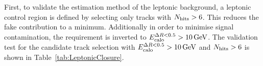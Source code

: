 First, to validate the estimation method of the leptonic background, a leptonic control region is defined by selecting only tracks with $\nhits>6$.
This reduces the fake contribution to a minimum.
Additionally in order to minimise signal contamination, the \ecalo requirement is inverted to $\ecalo>10\gev$.
The validation test for the candidate track selection with $\ecalo>10\gev$ and $\nhits>6$ is shown in Table~\ref{tab:LeptonicClosure}.
\renewcommand{\arraystretch}{1.4}
\begin{table}[!h]
\centering
\caption{Validation test of leptonic background estimation. Left: $\ecalo>10\gev$ and $\nhits>6$ (only statistical uncertainties are included). Right: $\ecalo>10\gev$, $\nhits>6$ and $\ias>0.2$}
\label{tab:LeptonicClosure}
\end{table}\\


